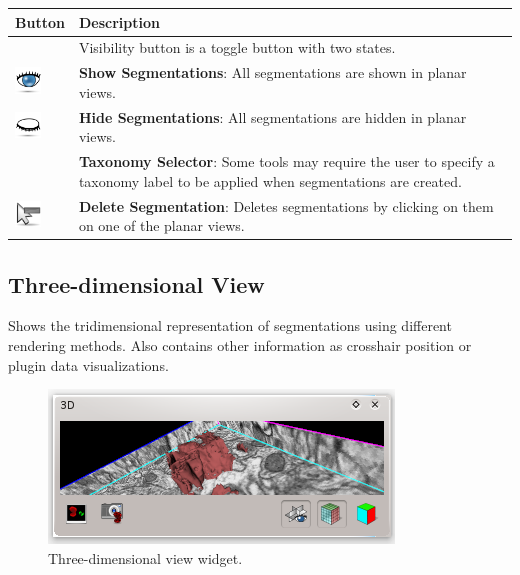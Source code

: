 \begin{tabular}{| m{1.3cm} | m{13.5cm} |}
\hline
\textbf{Button} & \textbf{Description}\\
\hline
& Visibility button is a toggle button with two states.\\ 
\includegraphics[width=0.7cm]{../../frontend/rsc/show_all} &
\textbf{Show Segmentations}: All segmentations are shown in planar views.\\
\includegraphics[width=0.7cm]{../../frontend/rsc/hide_all} &
\textbf{Hide Segmentations}: All segmentations are hidden in planar views.\\
\hline
 & %
\textbf{Taxonomy Selector}: Some tools may require the user to specify a
taxonomy label to be applied when segmentations are created.\\
\hline
\includegraphics[width=0.7cm]{../../frontend/rsc/removeSeg} &
\textbf{Delete Segmentation}: Deletes segmentations by clicking on them on one of the planar views.\\
\hline
\end{tabular}

\subsection{Three-dimensional View}
Shows the tridimensional representation of segmentations using different rendering methods. Also contains
other information as crosshair position or plugin data visualizations.
\begin{figure}[H]
\centering
\includegraphics{fig/VolumeView}
\caption{Three-dimensional view widget.}
\end{figure}

